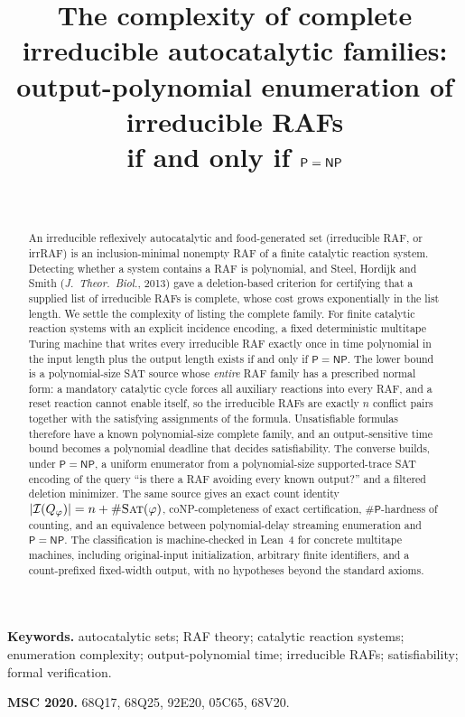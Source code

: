 \documentclass[11pt,a4paper]{article}
\title{The complexity of complete irreducible autocatalytic families:\\
output-polynomial enumeration of irreducible RAFs\\ if and only if $\PP=\NP$}
\author{\PaperAuthor\\ \PaperAffiliation}
\date{\PaperDate}
\theoremstyle{plain}
\theoremstyle{definition}
\theoremstyle{remark}
\newcommand{\Irr}{\mathcal I}
\newcommand{\PP}{\mathsf P}
\newcommand{\NP}{\mathsf{NP}}
\newcommand{\sharpP}{\#\mathsf P}
\newcommand{\SAT}{\textup{\textsc{Sat}}}
\begin{document}
\maketitle

\begin{abstract}
An irreducible reflexively autocatalytic and food-generated set (irreducible RAF, or irrRAF) is an inclusion-minimal nonempty RAF of a finite catalytic reaction system. Detecting whether a system contains a RAF is polynomial, and Steel, Hordijk and Smith (\emph{J.\ Theor.\ Biol.}, 2013) gave a deletion-based criterion for certifying that a supplied list of irreducible RAFs is complete, whose cost grows exponentially in the list length. We settle the complexity of listing the complete family. For finite catalytic reaction systems with an explicit incidence encoding, a fixed deterministic multitape Turing machine that writes every irreducible RAF exactly once in time polynomial in the input length plus the output length exists if and only if $\PP=\NP$. The lower bound is a polynomial-size SAT source whose \emph{entire} RAF family has a prescribed normal form: a mandatory catalytic cycle forces all auxiliary reactions into every RAF, and a reset reaction cannot enable itself, so the irreducible RAFs are exactly $n$ conflict pairs together with the satisfying assignments of the formula. Unsatisfiable formulas therefore have a known polynomial-size complete family, and an output-sensitive time bound becomes a polynomial deadline that decides satisfiability. The converse builds, under $\PP=\NP$, a uniform enumerator from a polynomial-size supported-trace SAT encoding of the query ``is there a RAF avoiding every known output?'' and a filtered deletion minimizer. The same source gives an exact count identity $|\Irr(Q_\varphi)|=n+\#\SAT(\varphi)$, coNP-completeness of exact certification, $\sharpP$-hardness of counting, and an equivalence between polynomial-delay streaming enumeration and $\PP=\NP$. The classification is machine-checked in Lean~4 for concrete multitape machines, including original-input initialization, arbitrary finite identifiers, and a count-prefixed fixed-width output, with no hypotheses beyond the standard axioms.
\end{abstract}

\noindent\textbf{Keywords.} autocatalytic sets; RAF theory; catalytic reaction systems; enumeration complexity; output-polynomial time; irreducible RAFs; satisfiability; formal verification.

\medskip
\noindent\textbf{MSC 2020.} 68Q17, 68Q25, 92E20, 05C65, 68V20.
\end{document}
